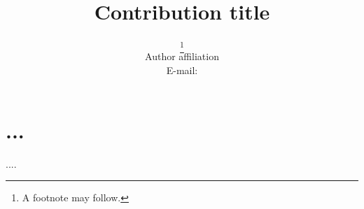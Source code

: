 \documentclass{PoS}
\title{Contribution title}
\author{\speaker{Hua Wei}\thanks{A footnote may follow.}\\
        Author affiliation\\
        E-mail: \email{hua.wei@cern.ch}}
\begin{document}
\section{...}

\begin{thebibliography}{99}
....

\end{thebibliography}
\end{document}
